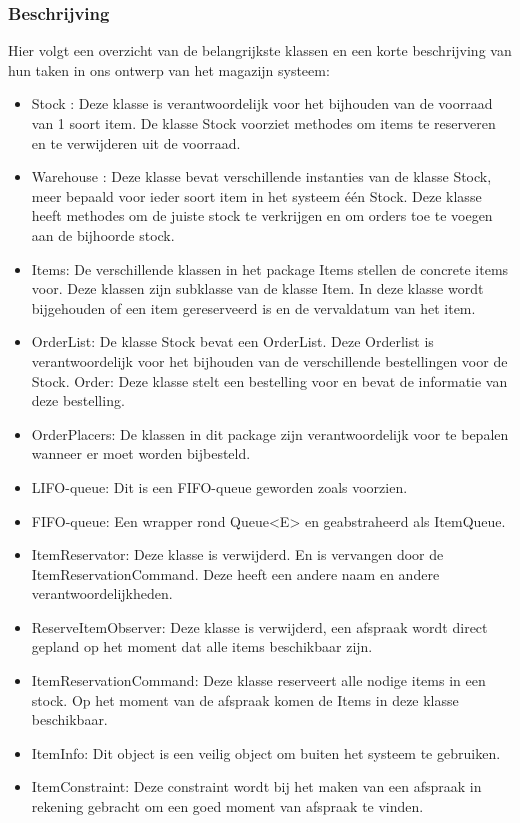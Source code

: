 \documentclass[a4paper]{article}
\begin{document}
\subsubsection{Beschrijving}
Hier volgt een overzicht van de belangrijkste klassen en een korte beschrijving van hun taken in ons ontwerp van het magazijn systeem:
\begin{itemize}
\item Stock :  Deze klasse is verantwoordelijk voor het bijhouden van de voorraad van 1 soort item. De klasse Stock voorziet methodes om items te reserveren en te verwijderen uit de voorraad.
\item Warehouse : Deze klasse bevat verschillende instanties van de klasse Stock, meer bepaald voor ieder soort item in het systeem één Stock. Deze klasse heeft methodes om de juiste stock te verkrijgen en om orders toe te voegen aan de bijhoorde stock.
\item Items: De verschillende klassen in het package Items stellen de concrete items voor. Deze klassen zijn subklasse van de klasse Item. In deze klasse wordt bijgehouden of een item gereserveerd is en de vervaldatum van het item.
\item OrderList: De klasse Stock bevat een OrderList. Deze Orderlist is verantwoordelijk voor het bijhouden van de verschillende bestellingen voor de Stock.
Order: Deze klasse stelt een bestelling voor en bevat de informatie van deze bestelling.
\item OrderPlacers: De klassen in dit package zijn verantwoordelijk voor te bepalen wanneer er moet worden bijbesteld.
\item LIFO-queue: Dit is een FIFO-queue geworden zoals voorzien.
\item FIFO-queue: Een wrapper rond Queue<E> en geabstraheerd als ItemQueue.
\item ItemReservator: Deze klasse is verwijderd. En is vervangen door de ItemReservationCommand. Deze heeft een andere naam en andere verantwoordelijkheden.
\item ReserveItemObserver: Deze klasse is verwijderd, een afspraak wordt direct gepland op het moment dat alle items beschikbaar zijn.
\item ItemReservationCommand: Deze klasse reserveert alle nodige items in een stock. Op het moment van de afspraak komen de Items in deze klasse beschikbaar.
\item ItemInfo: Dit object is een veilig object om buiten het systeem te gebruiken. 
\item ItemConstraint: Deze constraint wordt bij het maken van een afspraak in rekening gebracht om een goed moment van afspraak te vinden.
\end{itemize}
\end{document}
